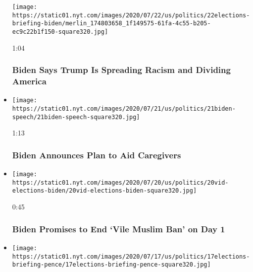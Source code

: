 \begin{itemize}
  \texttt{[image: https://static01.nyt.com/images/2020/07/22/us/politics/22elections-briefing-biden/merlin\_174803658\_1f149575-61fa-4c55-b205-ec9c22b1f150-square320.jpg]}

  1:04

  \hypertarget{biden-says-trump-is-spreading-racism-and-dividing-america}{%
  \subsubsection{Biden Says Trump Is Spreading Racism and Dividing
  America}\label{biden-says-trump-is-spreading-racism-and-dividing-america}}
\item
  \href{https://www.nytimes.com/video/us/100000007249436/biden-announces-plan-to-aid-caregivers.html?action=click\&module=video-series-bar\&region=header\&pgtype=Article\&playlistId=video/2020-Elections}{}

  \texttt{[image: https://static01.nyt.com/images/2020/07/21/us/politics/21biden-speech/21biden-speech-square320.jpg]}

  1:13

  \hypertarget{biden-announces-plan-to-aid-caregivers}{%
  \subsubsection{Biden Announces Plan to Aid
  Caregivers}\label{biden-announces-plan-to-aid-caregivers}}
\item
  \href{https://www.nytimes.com/video/us/100000007248132/biden-muslim-voters.html?action=click\&module=video-series-bar\&region=header\&pgtype=Article\&playlistId=video/2020-Elections}{}

  \texttt{[image: https://static01.nyt.com/images/2020/07/20/us/politics/20vid-elections-biden/20vid-elections-biden-square320.jpg]}

  0:45

  \hypertarget{biden-promises-to-end-vile-muslim-ban-on-day-1}{%
  \subsubsection{Biden Promises to End `Vile Muslim Ban' on Day
  1}\label{biden-promises-to-end-vile-muslim-ban-on-day-1}}
\item
  \href{https://www.nytimes.com/video/us/100000007244976/pence-calls-out-biden-wisconsin.html?action=click\&module=video-series-bar\&region=header\&pgtype=Article\&playlistId=video/2020-Elections}{}

  \texttt{[image: https://static01.nyt.com/images/2020/07/17/us/politics/17elections-briefing-pence/17elections-briefing-pence-square320.jpg]}


\end{itemize}
